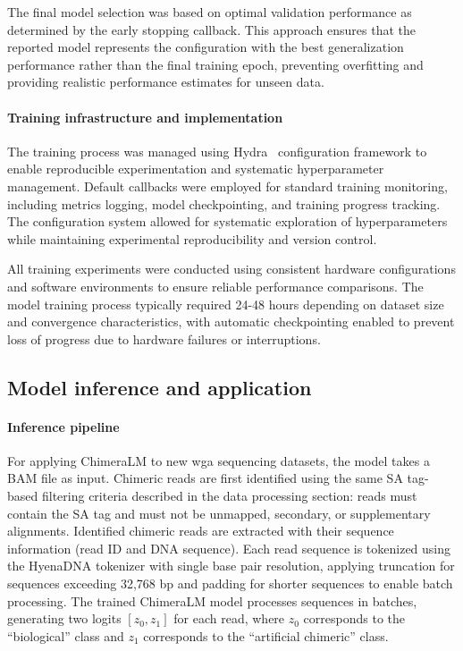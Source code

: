 \documentclass[pdflatex,sn-nature]{sn-jnl}%
\theoremstyle{thmstyleone}%
\theoremstyle{thmstyletwo}%
\theoremstyle{thmstylethree}%
\begin{document}
The final model selection was based on optimal validation performance as determined by the early stopping callback.
This approach ensures that the reported model represents the configuration with the best generalization performance rather than the final training epoch, preventing overfitting and providing realistic performance estimates for unseen data.

\paragraph{Training infrastructure and implementation}
The training process was managed using Hydra~\cite{Yadan2019Hydra} configuration framework to enable reproducible experimentation and systematic hyperparameter management.
Default callbacks were employed for standard training monitoring, including metrics logging, model checkpointing, and training progress tracking.
The configuration system allowed for systematic exploration of hyperparameters while maintaining experimental reproducibility and version control.

All training experiments were conducted using consistent hardware configurations and software environments to ensure reliable performance comparisons.
The model training process typically required 24-48 hours depending on dataset size and convergence characteristics, with automatic checkpointing enabled to prevent loss of progress due to hardware failures or interruptions.

\subsection*{Model inference and application}

\paragraph{Inference pipeline}
For applying ChimeraLM to new \gls{wga} sequencing datasets, the model takes a BAM file as input.
Chimeric reads are first identified using the same SA tag-based filtering criteria described in the data processing section: reads must contain the SA tag and must not be unmapped, secondary, or supplementary alignments.
Identified chimeric reads are extracted with their sequence information (read ID and DNA sequence).
Each read sequence is tokenized using the HyenaDNA tokenizer with single base pair resolution, applying truncation for sequences exceeding 32,768 bp and padding for shorter sequences to enable batch processing.
The trained ChimeraLM model processes sequences in batches, generating two logits $[z_0, z_1]$ for each read, where $z_0$ corresponds to the ``biological'' class and $z_1$ corresponds to the ``artificial chimeric'' class.
\end{document}
